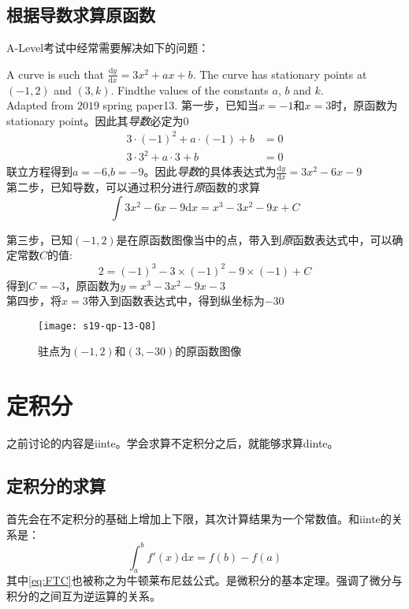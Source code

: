 \subsection*{根据导数求算原函数}
A-Level考试中经常需要解决如下的问题：
\begin{ExampleBox}
A curve is such that $\frac{\mathrm{d} y}{\mathrm{d} x}=3x^2 + ax + b$. The curve has stationary points at $(-1, 2)$ and $(3, k)$. Findthe values of the constants $a$, $b$ and $k$.\\
\mbox{}\hfill Adapted from $2019$ spring paper13.
\tcblower
第一步，已知当$x=-1$和$x=3$时，原函数为stationary point。因此其\emph{导数}必定为$0$
\begin{align*}
 3\cdot(-1)^2+a\cdot (-1) +b &=0 \\
 3\cdot3^2+a\cdot3+b &=0
\end{align*}
联立方程得到$a=-6$,$b=-9$。因此\emph{导数}的具体表达式为$\frac{\mathrm{d} y}{\mathrm{d} x}=3x^2 -6x -9$\\

第二步，已知导数，可以通过积分进行\emph{原}函数的求算
\[
	\int 3x^2 -6x -9 \mathrm{d} x =x^3-3x^2-9x+C
\]

第三步，已知$(-1,2)$是在原函数图像当中的点，带入到\emph{原}函数表达式中，可以确定常数$C$的值:
\[
	2= (-1)^3-3\times (-1)^2-9\times(-1)+C
\]
得到$C=-3$，原函数为$y=x^{3}-3x^{2}-9x-3$\\

第四步，将$x=3$带入到函数表达式中，得到纵坐标为$-30$

\begin{figure}[H]
\centering
\texttt{[image: s19-qp-13-Q8]}
\caption{驻点为$(-1,2)$和$(3,-30)$的原函数图像}
\end{figure}
\end{ExampleBox}
\clearpage


\section{定积分}
\label{sec:Definite Integral}
之前讨论的内容是\gls{iinte}。学会求算不定积分之后，就能够求算\gls{dinte}。

\subsection*{定积分的求算}
首先会在不定积分的基础上增加上下限，其次计算结果为一个常数值。和\gls{iinte}的关系是：
\begin{equation}
\int_{a}^{b}f'(x)\mathrm{d} x=f(b)-f(a)
\tag{Fundamental Law of Calculus}
\label{eq:FTC}
\end{equation}
其中\ref{eq:FTC}也被称之为牛顿莱布尼兹公式。是微积分的基本定理。强调了微分与积分的之间互为逆运算的关系。


